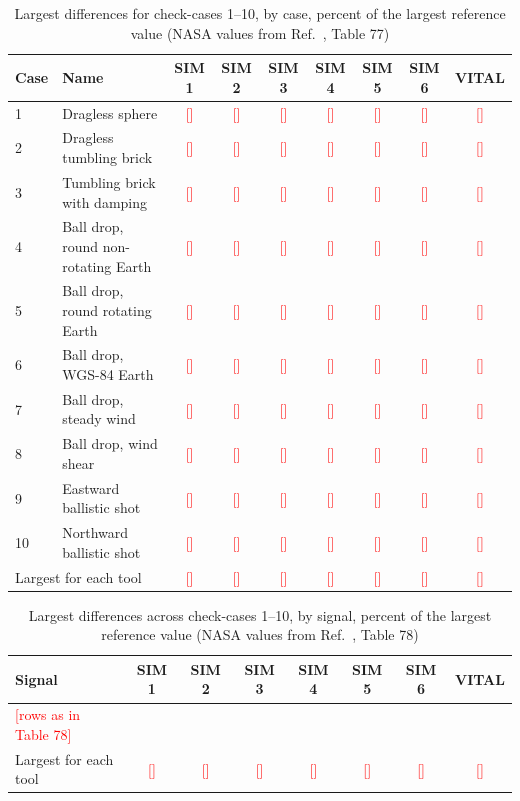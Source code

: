 \documentclass[conf]{new-aiaa}
\newcommand{\tbd}[1]{\textcolor{red}{[#1]}}
\begin{document}
\begin{table}[hbt!]
\caption{\label{tab:case110} Largest differences for check-cases 1--10, by case, percent of
the largest reference value (NASA values from Ref.~\cite{nesc2015}, Table 77)}
\centering
\small
\begin{tabular}{llccccccc}
\hline\hline
Case & Name & SIM 1 & SIM 2 & SIM 3 & SIM 4 & SIM 5 & SIM 6 & VITAL \\\hline
1  & Dragless sphere                     & \tbd{} & \tbd{} & \tbd{} & \tbd{} & \tbd{} & \tbd{} & \tbd{} \\
2  & Dragless tumbling brick             & \tbd{} & \tbd{} & \tbd{} & \tbd{} & \tbd{} & \tbd{} & \tbd{} \\
3  & Tumbling brick with damping         & \tbd{} & \tbd{} & \tbd{} & \tbd{} & \tbd{} & \tbd{} & \tbd{} \\
4  & Ball drop, round non-rotating Earth & \tbd{} & \tbd{} & \tbd{} & \tbd{} & \tbd{} & \tbd{} & \tbd{} \\
5  & Ball drop, round rotating Earth     & \tbd{} & \tbd{} & \tbd{} & \tbd{} & \tbd{} & \tbd{} & \tbd{} \\
6  & Ball drop, WGS-84 Earth             & \tbd{} & \tbd{} & \tbd{} & \tbd{} & \tbd{} & \tbd{} & \tbd{} \\
7  & Ball drop, steady wind              & \tbd{} & \tbd{} & \tbd{} & \tbd{} & \tbd{} & \tbd{} & \tbd{} \\
8  & Ball drop, wind shear               & \tbd{} & \tbd{} & \tbd{} & \tbd{} & \tbd{} & \tbd{} & \tbd{} \\
9  & Eastward ballistic shot             & \tbd{} & \tbd{} & \tbd{} & \tbd{} & \tbd{} & \tbd{} & \tbd{} \\
10 & Northward ballistic shot            & \tbd{} & \tbd{} & \tbd{} & \tbd{} & \tbd{} & \tbd{} & \tbd{} \\\hline
\multicolumn{2}{l}{Largest for each tool} & \tbd{} & \tbd{} & \tbd{} & \tbd{} & \tbd{} & \tbd{} & \tbd{} \\
\hline\hline
\end{tabular}
\end{table}

\begin{table}[hbt!]
\caption{\label{tab:sig110} Largest differences across check-cases 1--10, by signal, percent
of the largest reference value (NASA values from Ref.~\cite{nesc2015}, Table 78)}
\centering
\small
\begin{tabular}{lccccccc}
\hline\hline
Signal & SIM 1 & SIM 2 & SIM 3 & SIM 4 & SIM 5 & SIM 6 & VITAL \\\hline
\tbd{rows as in Table 78} & & & & & & & \\\hline
Largest for each tool & \tbd{} & \tbd{} & \tbd{} & \tbd{} & \tbd{} & \tbd{} & \tbd{} \\
\hline\hline
\end{tabular}
\end{table}
\end{document}
